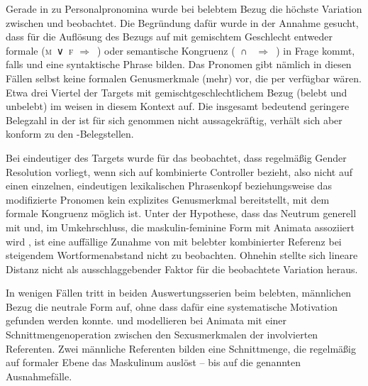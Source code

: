 Gerade in  zu Personalpronomina wurde
bei belebtem Bezug die höchste Variation zwischen  und
 beobachtet. Die Begründung dafür wurde in der Annahme gesucht,
dass für die Auflösung des Bezugs auf 
mit gemischtem Geschlecht entweder formale (\textsc{m}~∨~\textsc{f}
$\Rightarrow$~) oder semantische Kongruenz (\SM{}~∩~\SF{}
$\Rightarrow$~) in Frage kommt, falls  und  eine
syntaktische Phrase bilden. Das Pronomen gibt nämlich in diesen Fällen selbst
keine formalen Genus\-merk\-male (mehr) vor, die per  verfügbar
wären. Etwa drei Viertel der Targets mit gemischtgeschlechtlichem
Bezug (belebt und unbelebt) im \CAO{} weisen in
diesem Kontext  auf. Die insgesamt bedeutend geringere
Belegzahl in der \KC{} ist für sich genommen nicht aussagekräftig, verhält sich
aber konform zu den \CAO-Belegstellen.

Bei eindeutiger  des Targets wurde für das
\CAO{} beobachtet, dass regel\-mäßig Gender Re\-solu\-tion vorliegt, wenn sich
 auf kombinierte Controller bezieht, also nicht auf einen
einzelnen, eindeutigen lexikalischen Phrasenkopf beziehungsweise das
modifizierte Pronomen kein explizites Genusmerkmal bereitstellt, mit dem
formale Kongruenz möglich ist. Unter der Hypothese, dass das Neutrum generell
mit  und, im Umkehrschluss, die maskulin-feminine Form mit
Animata assoziiert wird \autocite[243--245]{askedal1973}, ist eine auffällige
Zunahme von  mit belebter kombinierter Referenz bei steigendem
Wortformenabstand nicht zu beobachten. Ohnehin stellte sich
lineare Distanz nicht als ausschlaggebender Faktor für die
beob\-ach\-tete Variation heraus.

In wenigen Fällen tritt in beiden Auswertungs\-serien beim belebten, männlichen
Bezug die neutrale Form auf, ohne dass dafür eine systematische Motivation
gefunden werden konnte. \citet{wechslerzlatic2003} und \citet{wechsler2009}
modellieren  bei Animata mit einer
Schnittmengenoperation zwischen den Sexusmerkmalen der
involvierten Referenten. Zwei männliche Referenten bilden eine Schnittmenge,
die regelmäßig auf formaler Ebene das Maskulinum auslöst -- bis auf die
genannten Ausnahmefälle.


